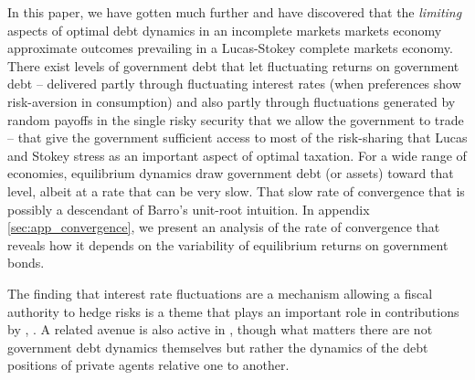 \documentclass[12pt]{article}
\newcommand{\dge}[1]{\textcolor{blue}{$^{\textrm{dge}}${#1}}}
\newcommand{\tjs}[1]{\textcolor{red}{$^{\textrm{tjs}}${#1}}}
\begin{document}
  In this paper, we have gotten much further and have discovered that   the {\em limiting} aspects of optimal debt dynamics in an  incomplete markets
  markets economy approximate outcomes prevailing in a Lucas-Stokey complete markets economy.
  There exist levels of government debt that let fluctuating returns on government debt -- delivered partly through fluctuating interest rates (when
  preferences show risk-aversion in consumption) and also partly through fluctuations generated by random payoffs in the single risky security
  that we allow the government to trade -- that give the government sufficient access to most of the risk-sharing that Lucas and Stokey stress as an important
  aspect of optimal taxation.  For a wide range of economies,  equilibrium dynamics draw government debt  (or assets)  toward that level, albeit at
  a rate that can be very slow.  That slow rate of convergence that is possibly a descendant of  Barro's unit-root intuition.
 In appendix \ref{sec:app_convergence}, we present an analysis of the rate of convergence that reveals how it depends on the variability
 of equilibrium returns on government bonds.%

  The finding that interest rate fluctuations are a mechanism allowing a fiscal authority to hedge risks is a theme that plays an important role in
   contributions by \citet{Faraglia2011}, \citet{BerndtLustigYeltekin}.  A related  avenue  is also active in
\citet{BEGS1}, though what matters there are not government debt dynamics themselves but rather the dynamics of the debt positions
of private agents relative  one to another.
%
\end{document}

